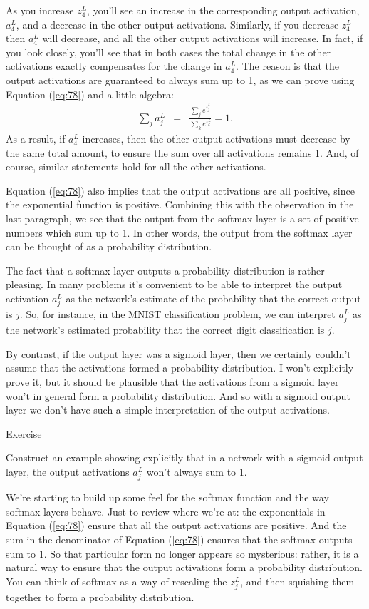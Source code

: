\documentclass[a4paper,twoside,10pt]{book}
\begin{document}
As you increase $z^L_4$, you'll see an increase in the corresponding output activation, $a^L_4$, and a decrease in the other output activations. Similarly, if you decrease $z^L_4$ then $a^L_4$ will decrease, and all the other output activations will increase. In fact, if you look closely, you'll see that in both cases the total change in the other activations exactly compensates for the change in $a^L_4$. The reason is that the output activations are guaranteed to always sum up to 1, as we can prove using Equation (\ref{eq:78}) and a little algebra:
\begin{eqnarray}
\sum_j a^L_j & = & \frac{\sum_j e^{z^L_j}}{\sum_k e^{z^L_k}} = 1.
\label{eq:79}\end{eqnarray}
As a result, if $a^L_4$ increases, then the other output activations must decrease by the same total amount, to ensure the sum over all activations remains 1. And, of course, similar statements hold for all the other activations.

Equation (\ref{eq:78}) also implies that the output activations are all positive, since the exponential function is positive. Combining this with the observation in the last paragraph, we see that the output from the softmax layer is a set of positive numbers which sum up to 1. In other words, the output from the softmax layer can be thought of as a probability distribution.

The fact that a softmax layer outputs a probability distribution is rather pleasing. In many problems it's convenient to be able to interpret the output activation $a^L_j$ as the network's estimate of the probability that the correct output is $j$. So, for instance, in the MNIST classification problem, we can interpret $a^L_j$ as the network's estimated probability that the correct digit classification is $j$.

By contrast, if the output layer was a sigmoid layer, then we certainly couldn't assume that the activations formed a probability distribution. I won't explicitly prove it, but it should be plausible that the activations from a sigmoid layer won't in general form a probability distribution. And so with a sigmoid output layer we don't have such a simple interpretation of the output activations.

\begin{exercize}{Exercise}
	\item Construct an example showing explicitly that in a network with a sigmoid output layer, the output activations $a^L_j$ won't always sum to 1.
\end{exercize}
We're starting to build up some feel for the softmax function and the way softmax layers behave. Just to review where we're at: the exponentials in Equation (\ref{eq:78}) ensure that all the output activations are positive. And the sum in the denominator of Equation (\ref{eq:78}) ensures that the softmax outputs sum to 1. So that particular form no longer appears so mysterious: rather, it is a natural way to ensure that the output activations form a probability distribution. You can think of softmax as a way of rescaling the $z^L_j$, and then squishing them together to form a probability distribution.
\end{document}
